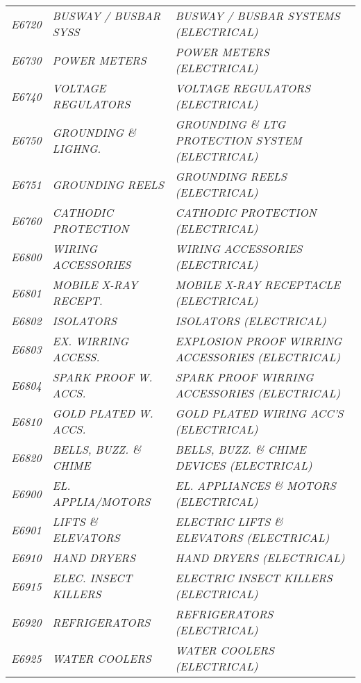 \begin{landscape}
\begin{longtable}[l]{l%
                  l|%
                  l|}
\itshape E6720       &\itshape BUSWAY / BUSBAR SYSS   &\itshape BUSWAY / BUSBAR SYSTEMS (ELECTRICAL)   \\
\itshape E6730       &\itshape POWER METERS   &\itshape POWER METERS (ELECTRICAL)   \\
\itshape E6740       &\itshape VOLTAGE REGULATORS   &\itshape VOLTAGE REGULATORS (ELECTRICAL)   \\
\itshape E6750       &\itshape GROUNDING \& LIGHNG.   &\itshape GROUNDING \& LTG PROTECTION SYSTEM (ELECTRICAL)   \\
\itshape E6751       &\itshape GROUNDING REELS   &\itshape GROUNDING REELS (ELECTRICAL)   \\
\itshape E6760       &\itshape CATHODIC PROTECTION   &\itshape CATHODIC PROTECTION (ELECTRICAL)   \\
\itshape E6800       &\itshape WIRING ACCESSORIES   &\itshape WIRING ACCESSORIES (ELECTRICAL)   \\
\itshape E6801       &\itshape MOBILE X-RAY RECEPT.   &\itshape MOBILE X-RAY RECEPTACLE (ELECTRICAL)   \\
\itshape E6802       &\itshape ISOLATORS   &\itshape ISOLATORS (ELECTRICAL)   \\
\itshape E6803       &\itshape EX. WIRRING ACCESS.   &\itshape EXPLOSION PROOF WIRRING ACCESSORIES (ELECTRICAL)   \\
\itshape E6804       &\itshape SPARK PROOF W. ACCS.   &\itshape SPARK PROOF WIRRING ACCESSORIES (ELECTRICAL)   \\
\itshape E6810       &\itshape GOLD PLATED W. ACCS.   &\itshape GOLD PLATED WIRING ACC'S (ELECTRICAL)   \\
\itshape E6820       &\itshape BELLS, BUZZ. \& CHIME   &\itshape BELLS, BUZZ. \& CHIME DEVICES (ELECTRICAL)   \\
\itshape E6900       &\itshape EL. APPLIA/MOTORS   &\itshape EL. APPLIANCES \& MOTORS (ELECTRICAL)   \\
\itshape E6901       &\itshape LIFTS \& ELEVATORS   &\itshape ELECTRIC LIFTS \& ELEVATORS (ELECTRICAL)   \\
\itshape E6910       &\itshape HAND DRYERS   &\itshape HAND DRYERS (ELECTRICAL)   \\
\itshape E6915       &\itshape ELEC. INSECT KILLERS   &\itshape ELECTRIC INSECT KILLERS (ELECTRICAL)   \\
\itshape E6920       &\itshape REFRIGERATORS   &\itshape REFRIGERATORS (ELECTRICAL)   \\
\itshape E6925       &\itshape WATER COOLERS   &\itshape WATER COOLERS (ELECTRICAL)   \\

\end{longtable}
\end{landscape}
